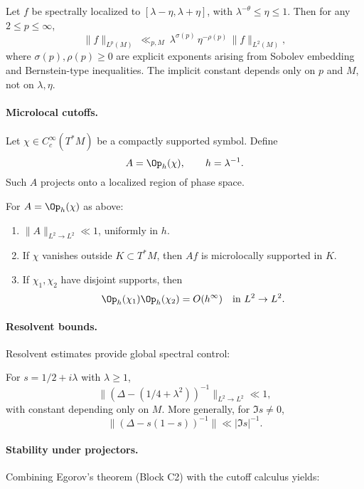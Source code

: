 \begin{theorem}\label{thm:C3-sobolev}
Let $f$ be spectrally localized to $[\lambda-\eta,\lambda+\eta]$, with
$\lambda^{-\theta}\le \eta\le 1$. Then for any $2\le p\le\infty$,
\[
\|f\|_{L^p(M)} \ \ll_{p,M}\ \lambda^{\sigma(p)}\,\eta^{-\rho(p)}\,\|f\|_{L^2(M)},
\]
where $\sigma(p),\rho(p)\ge 0$ are explicit exponents arising from Sobolev
embedding and Bernstein-type inequalities. The implicit constant depends only
on $p$ and $M$, not on $\lambda,\eta$.
\end{theorem}

\paragraph{Microlocal cutoffs.}
Let $\chi\in C_c^\infty(T^*M)$ be a compactly supported symbol. Define
\[
A=\Op_h(\chi), \qquad h=\lambda^{-1}.
\]
Such $A$ projects onto a localized region of phase space.

\begin{lemma}\label{lem:C3-cutoff}
For $A=\Op_h(\chi)$ as above:
\begin{enumerate}
  \item $\|A\|_{L^2\to L^2}\ll 1$, uniformly in $h$.
  \item If $\chi$ vanishes outside $K\subset T^*M$, then $Af$ is microlocally
  supported in $K$.
  \item If $\chi_1,\chi_2$ have disjoint supports, then
  \[
  \Op_h(\chi_1)\Op_h(\chi_2) = O(h^\infty)\quad\text{in }L^2\to L^2.
  \]
\end{enumerate}
\end{lemma}

\paragraph{Resolvent bounds.}
Resolvent estimates provide global spectral control:

\begin{proposition}\label{prop:C3-resolvent}
For $s=1/2+i\lambda$ with $\lambda\ge 1$,
\[
\big\|(\Delta - (1/4+\lambda^2))^{-1}\big\|_{L^2\to L^2} \ll 1,
\]
with constant depending only on $M$. More generally, for $\Im s\neq 0$,
\[
\|(\Delta-s(1-s))^{-1}\|\ll |\Im s|^{-1}.
\]
\end{proposition}

\paragraph{Stability under projectors.}
Combining Egorov’s theorem (Block C2) with the cutoff calculus yields:

